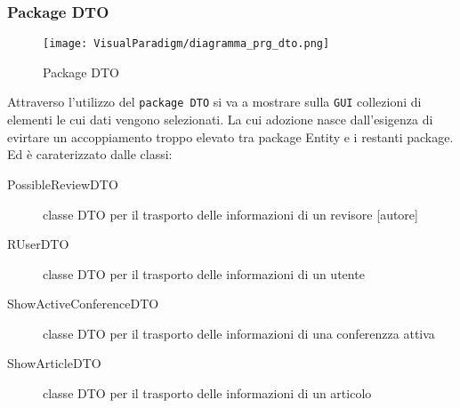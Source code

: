 \subsubsection{Package DTO}

\label{sec:package_dto_prg_image}
\begin{figure}[ht]
  \centering
  \texttt{[image: VisualParadigm/diagramma\_prg\_dto.png]}
  \caption{Package DTO}
  \label{fig:Package DTO}
\end{figure}

Attraverso l'utilizzo del \texttt{package DTO} si va a mostrare sulla \texttt{GUI} collezioni di elementi le cui dati vengono selezionati. La cui adozione nasce dall'esigenza di evirtare un accoppiamento troppo elevato tra package Entity e i restanti package. Ed è caraterizzato dalle classi:
\begin{description}
\item[PossibleReviewDTO] classe DTO per il trasporto delle informazioni di un revisore [autore]
\item[RUserDTO] classe DTO per il trasporto delle informazioni di un utente
\item[ShowActiveConferenceDTO] classe DTO per il trasporto delle informazioni di una conferenzza attiva
\item[ShowArticleDTO] classe DTO per il trasporto delle informazioni di un articolo
\end{description}
